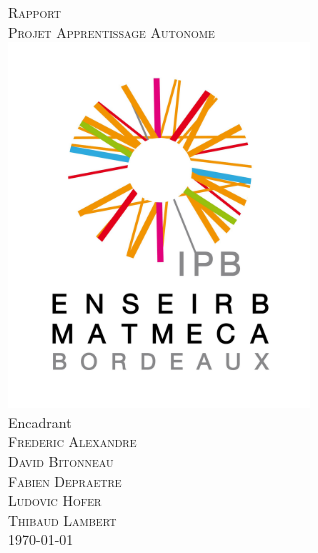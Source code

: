 \documentclass[a4paper, 11pt]{article}
\begin{document}
\begin{titlepage}
\begin{center}
\textsc{\huge Rapport}\\[3cm]
\textsc{\Huge Projet Apprentissage Autonome}\\[3cm]
\includegraphics[width=8cm]{image/logo-IPB.png}\\[1cm]
{\Large Encadrant}\\[0.2cm]
\textsc{\Large Frederic Alexandre}\\[1.5cm]
\textsc{\Large David Bitonneau}\\
\textsc{\Large Fabien Depraetre}\\
\textsc{\Large Ludovic Hofer}\\
\textsc{\Large Thibaud Lambert}\\[1.5cm]
\textsc{\Large \today}\\
\end{center}
\end{titlepage}

\clearpage
\tableofcontents
\clearpage






\end{document}
